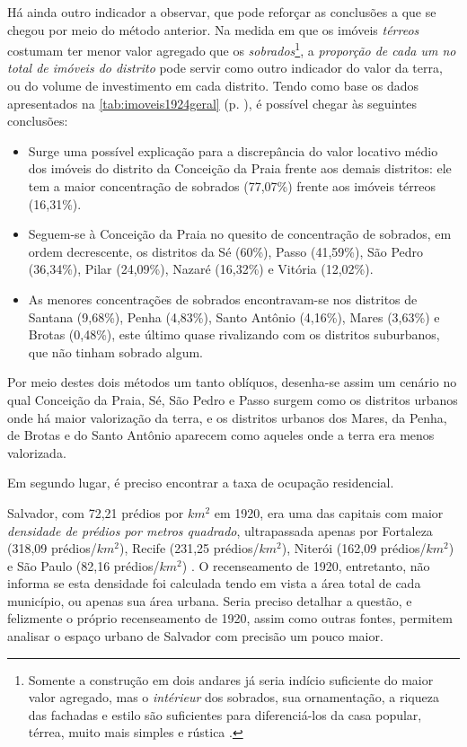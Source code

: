 Há ainda outro indicador a observar, que pode reforçar as conclusões a que se chegou por meio do método anterior. Na medida em que os imóveis \textit{térreos} costumam ter menor valor agregado que os \textit{sobrados}\footnote{Somente a construção em dois andares já seria indício suficiente do maior valor agregado, mas o \textit{intérieur} dos sobrados, sua ornamentação, a riqueza das fachadas e estilo são suficientes para diferenciá-los da casa popular, térrea, muito mais simples e rústica \cite[pp.~87-111]{ott_formaet1_1955}.}, a \textit{proporção de cada um no total de imóveis do distrito} pode servir como outro indicador do valor da terra, ou do volume de investimento em cada distrito. Tendo como base os dados apresentados na \autoref{tab:imoveis1924geral} (p. \pageref{tab:imoveis1924geral}), é possível chegar às seguintes conclusões:

\begin{itemize}
\item Surge uma possível explicação para a discrepância do valor locativo médio dos imóveis do distrito da Conceição da Praia frente aos demais distritos: ele tem a maior concentração de sobrados (77,07\%) frente aos imóveis térreos (16,31\%).
\item Seguem-se à Conceição da Praia no quesito de concentração de sobrados, em ordem decrescente, os distritos da Sé (60\%), Passo (41,59\%), São Pedro (36,34\%), Pilar (24,09\%), Nazaré (16,32\%) e Vitória (12,02\%).
\item As menores concentrações de sobrados encontravam-se nos distritos de Santana (9,68\%), Penha (4,83\%), Santo Antônio (4,16\%), Mares (3,63\%) e Brotas (0,48\%), este último quase rivalizando com os distritos suburbanos, que não tinham sobrado algum.
\end{itemize}

Por meio destes dois métodos um tanto oblíquos, desenha-se assim um cenário no qual Conceição da Praia, Sé, São Pedro e Passo surgem como os distritos urbanos onde há maior valorização da terra, e os distritos urbanos dos Mares, da Penha, de Brotas e do Santo Antônio aparecem como aqueles onde a terra era menos valorizada.

Em segundo lugar, é preciso encontrar a taxa de ocupação residencial.

Salvador, com 72,21 prédios por $km^{2}$ em 1920, era uma das capitais com maior \textit{densidade de prédios por metros quadrado}, ultrapassada apenas por Fortaleza (318,09 prédios/$km^{2}$), Recife (231,25 prédios/$km^{2}$), Niterói (162,09 prédios/$km^{2}$) e São Paulo (82,16 prédios/$km^{2}$) \cite[p.~XV]{brasil_censo46_1920}. O recenseamento de 1920, entretanto, não informa se esta densidade foi calculada tendo em vista a área total de cada município, ou apenas sua área urbana. Seria preciso detalhar a questão, e felizmente o próprio recenseamento de 1920, assim como outras fontes, permitem analisar o espaço urbano de Salvador com precisão um pouco maior.

